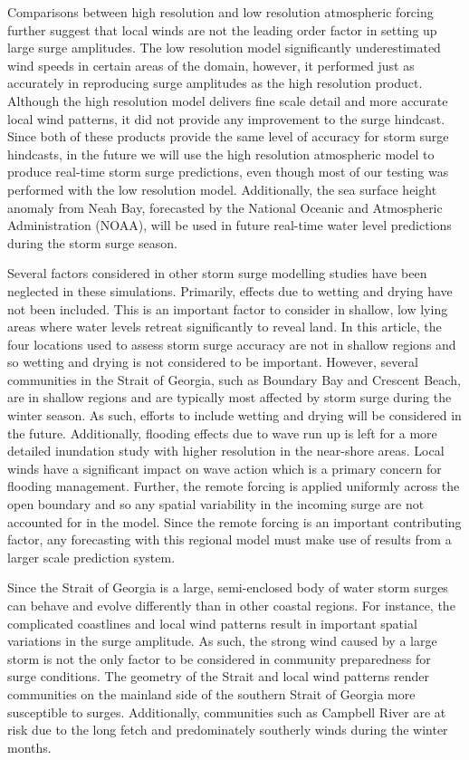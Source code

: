\documentclass[letterpaper]{tATO2e}
\begin{document}
Comparisons between high resolution and low resolution atmospheric forcing further suggest that local winds are not the leading order factor in setting up large surge amplitudes. The low resolution model significantly underestimated wind speeds in certain areas of the domain, however, it performed just as accurately in reproducing surge amplitudes as the high resolution product.  Although the high resolution model delivers fine scale detail and more accurate local wind patterns, it did not provide any improvement to the surge hindcast. Since both of these products provide the same level of accuracy for storm surge hindcasts, in the future we will use the high resolution atmospheric model to produce real-time storm surge predictions, even though most of our testing was performed with the low resolution model. Additionally, the sea surface height anomaly from Neah Bay, forecasted by the National Oceanic and Atmospheric Administration (NOAA), will be used in future real-time water level predictions during the storm surge season. 

Several factors considered in other storm surge modelling studies have been neglected in these simulations. Primarily, effects due to wetting and drying have not been included. This is an important factor to consider in shallow, low lying areas where water levels retreat significantly to reveal land. In this article, the four locations used to assess storm surge accuracy are not in shallow regions and so wetting and drying is not considered to be important. However, several communities in the Strait of Georgia, such as Boundary Bay and Crescent Beach, are in shallow regions and are typically most affected by storm surge during the winter season. As such, efforts to include wetting and drying will be considered in the future. Additionally, flooding effects due to wave run up is left for a more detailed inundation study with higher resolution in the near-shore areas. Local winds have a significant impact on wave action which is a primary concern for flooding management. Further, the remote forcing is applied uniformly across the open boundary and so any spatial variability in the incoming surge are not accounted for in the model. Since the remote forcing is an important contributing factor, any forecasting with this regional model must make use of results from a larger scale prediction system.  

Since the Strait of Georgia is a large, semi-enclosed body of water storm surges can behave and evolve differently than in other coastal regions. For instance, the complicated coastlines and local wind patterns result in important spatial variations in the surge amplitude. As such, the strong wind caused by a large storm is not the only factor to be considered in community preparedness for surge conditions. The geometry of the Strait and local wind patterns render communities on the mainland side of the southern Strait of Georgia more susceptible to surges. Additionally, communities such as Campbell River are at risk due to the long fetch and predominately southerly winds during the winter months.
\end{document}
